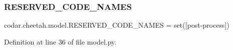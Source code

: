 \subsubsection{\texorpdfstring{R\+E\+S\+E\+R\+V\+E\+D\+\_\+\+C\+O\+D\+E\+\_\+\+N\+A\+M\+ES}{RESERVED\_CODE\_NAMES}}
{\footnotesize\ttfamily codar.\+cheetah.\+model.\+R\+E\+S\+E\+R\+V\+E\+D\+\_\+\+C\+O\+D\+E\+\_\+\+N\+A\+M\+ES = set(\mbox{[}\textquotesingle{}post-\/process\textquotesingle{}\mbox{]})}



Definition at line 36 of file model.\+py.

